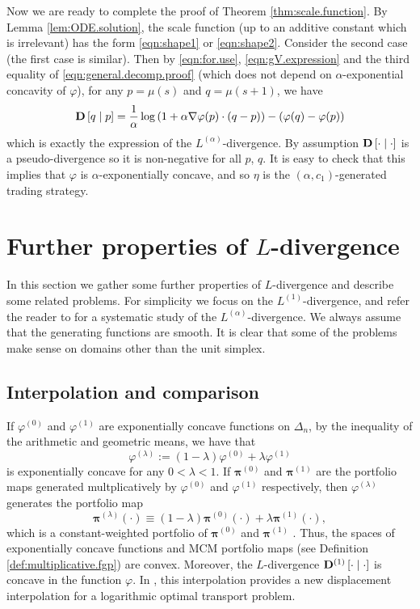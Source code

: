 \documentclass[graybox]{svmult}
\begin{document}
Now we are ready to complete the proof of Theorem \ref{thm:scale.function}. By Lemma \ref{lem:ODE.solution}, the scale function (up to an additive constant which is irrelevant) has the form \eqref{eqn:shape1} or \eqref{eqn:shape2}. Consider the second case (the first case is similar). Then by \eqref{eqn:for.use},  \eqref{eqn:gV.expression} and the third equality of \eqref{eqn:general.decomp.proof} (which does not depend on $\alpha$-exponential concavity of $\varphi$), for any $p = \mu(s)$ and $q = \mu(s + 1)$, we have
\[
{\bf D}\left[q \mid p\right] = \frac{1}{\alpha} \log \left( 1 + \alpha \nabla \varphi(p) \cdot (q - p)\right) - \left( \varphi(q) - \varphi(p)\right)
\]
which is exactly the expression of the $L^{(\alpha)}$-divergence. By assumption ${\bf D}\left[\cdot \mid \cdot\right]$ is a pseudo-divergence so it is non-negative for all $p$, $q$. It is easy to check that this implies that $\varphi$ is $\alpha$-exponentially concave, and so $\eta$ is the $(\alpha, c_1)$-generated trading strategy.



\section{Further properties of $L$-divergence} \label{sec:futher}
In this section we gather some further properties of $L$-divergence and describe some related problems. For simplicity we focus on the $L^{(1)}$-divergence, and refer the reader to \cite{W17b} for a systematic study of the $L^{(\alpha)}$-divergence. We always assume that the generating functions are smooth. It is clear that some of the problems make sense on domains other than the unit simplex.

\subsection{Interpolation and comparison}
If $\varphi^{(0)}$ and $\varphi^{(1)}$ are exponentially concave functions on $\Delta_n$, by the inequality of the arithmetic and geometric means, we have that
\[
\varphi^{(\lambda)} := (1 - \lambda) \varphi^{(0)} + \lambda \varphi^{(1)}
\]
is exponentially concave for any $0 < \lambda < 1$. If $\boldsymbol{\pi}^{(0)}$ and $\boldsymbol{\pi}^{(1)}$ are the portfolio maps generated multplicatively by $\varphi^{(0)}$ and $\varphi^{(1)}$ respectively, then $\varphi^{(\lambda)}$ generates the portfolio map
\[
\boldsymbol{\pi}^{(\lambda)}(\cdot) \equiv (1 - \lambda) \boldsymbol{\pi}^{(0)}(\cdot) + \lambda \boldsymbol{\pi}^{(1)}(\cdot),
\]
which is a constant-weighted portfolio of $\boldsymbol{\pi}^{(0)}$ and $\boldsymbol{\pi}^{(1)}$ \cite[Lemma 4.4]{W15}. Thus, the spaces of exponentially concave functions and MCM portfolio maps (see Definition \ref{def:multiplicative.fgp}) are convex. Moreover, the $L$-divergence ${\bf D}^{(1)}\left[ \cdot \mid \cdot\right]$ is concave in the function $\varphi$. In \cite{PW16}, this interpolation provides a new displacement interpolation for a logarithmic optimal transport problem.
\end{document}
